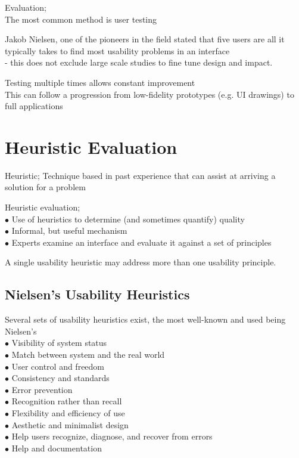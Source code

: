 \documentclass[]{project_plan}
\newcommand{\bulletPoint}{\hspace{-3.1pt}$\bullet$ \hspace{5pt}}
\begin{document}
Evaluation;\\
The most common method is user testing

Jakob Nielsen, one of the pioneers in the field stated that five users are all it typically
takes to find most usability problems in an interface\\
- this does not exclude large scale studies to fine tune design and impact.

Testing multiple times allows constant improvement\\
This can follow a progression from low-fidelity prototypes (e.g. UI drawings) to full
applications

\section{Heuristic Evaluation}
Heuristic; Technique based in past experience that can assist at arriving a solution
for a problem

Heuristic evaluation;\\
\bulletPoint Use of heuristics to determine (and sometimes quantify) quality\\
\bulletPoint Informal, but useful mechanism\\
\bulletPoint Experts examine an interface and evaluate it against a set of principles

A single usability heuristic may address more than one usability principle.

\newpage

\subsection{Nielsen’s Usability Heuristics}
Several sets of usability heuristics exist, the most well-known and used being Nielsen’s\\
\bulletPoint Visibility of system status\\
\bulletPoint Match between system and the real world\\
\bulletPoint User control and freedom\\
\bulletPoint Consistency and standards\\
\bulletPoint Error prevention\\
\bulletPoint Recognition rather than recall\\
\bulletPoint Flexibility and efficiency of use\\
\bulletPoint Aesthetic and minimalist design\\
\bulletPoint Help users recognize, diagnose, and recover from errors\\
\bulletPoint Help and documentation
\end{document}
